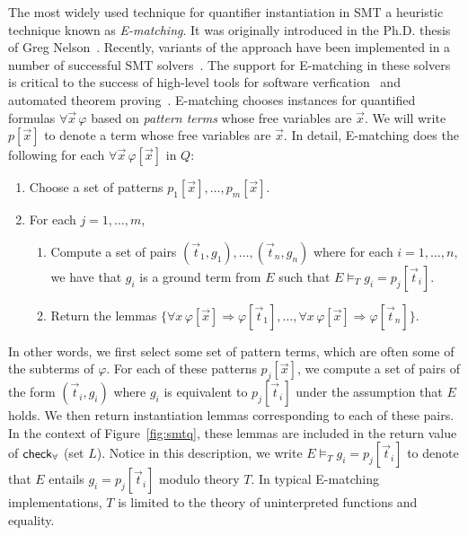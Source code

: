 \documentclass[oribibl]{llncs}
\begin{document}
The most widely used technique for quantifier instantiation in SMT a heuristic technique known as \emph{E-matching}.
It was originally introduced in the Ph.D. thesis of Greg Nelson~\cite{}.
Recently, variants of the approach have been implemented in a number of successful SMT solvers~\cite{}.
The support for E-matching in these solvers is critical to the success of high-level tools for 
software verfication~\cite{} and automated theorem proving~\cite{}.
E-matching chooses instances for quantified formulas $\forall \vec x\, \varphi$
based on \emph{pattern terms} whose free variables are $\vec x$.
We will write $p[ \vec x ]$ to denote a term whose free variables are $\vec x$.
In detail, 
E-matching does the following for each $\forall \vec x\, \varphi[ \vec x ]$ in $Q$:
\begin{enumerate}
\item Choose a set of patterns $p_1[ \vec x ], \ldots, p_m[ \vec x ]$.
\item For each $j = 1, \ldots, m$,
\begin{enumerate}
\item Compute a set of pairs $(\vec t_{1},g_{1}), \ldots, (\vec t_{n}, g_{n})$ 
where for each $i = 1, \ldots, n$, we have that $g_i$ is a ground term from $E$ such that $E \models_T g_{i} = p_j[ \vec t_{i} ]$.
\item Return the lemmas $\{ \forall x\, \varphi[\vec x] \Rightarrow \varphi[\vec t_{1}], \ldots, \forall x\, \varphi[\vec x] \Rightarrow \varphi[\vec t_{n}] \}$.
\end{enumerate}
\end{enumerate}

In other words, we first select some set of pattern terms, which are often some of the subterms of $\varphi$.
For each of these patterns $p_j[ \vec x ]$, we compute a set of pairs of the form $( \vec t_i, g_i )$ where 
$g_i$ is equivalent to $p_j[ \vec t_i ]$ under the assumption that $E$ holds.
We then return instantiation lemmas corresponding to each of these pairs. 
In the context of Figure~\ref{fig:smtq}, these lemmas are included in the return value of $\small\mathsf{check}_\forall$ (set $L$).
Notice in this description, we write $E \models_T g_{i} = p_j[ \vec t_{i} ]$ to denote that $E$ entails
$g_{i} = p_j[ \vec t_{i} ]$ modulo theory $T$.  In typical E-matching implementations, $T$ is limited to the theory of uninterpreted functions and equality.
\end{document}
